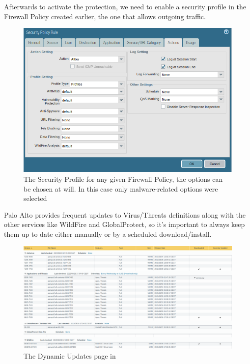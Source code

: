 \newpage

Afterwards to activate the protection, we need to enable a security profile in the Firewall Policy created earlier, the one that allows outgoing traffic.

\begin{figure}[h!]
 \centering
 \includegraphics[width=13.5cm]{img/policy_security.png}
 \caption{The Security Profile for any given Firewall Policy, the options can be chosen at will. In this case only malware-related options were selected}
 \label{fig: Policy Security Profile}
\end{figure}

Palo Alto provides frequent updates to Virus/Threats definitions along with the other services like WildFire and GlobalProtect, so it's important to always keep them up to date either manually or by a scheduled download/install.

\begin{figure}[h!]
 \centering
 \includegraphics[width=13.5cm]{img/updates.png}
 \caption{The Dynamic Updates page in }
 \label{fig: updates}
\end{figure}



